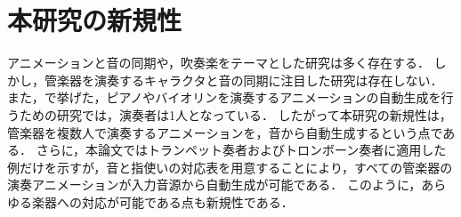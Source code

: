 \section{本研究の新規性}\label{sec:compere}
アニメーションと音の同期や，吹奏楽をテーマとした研究は多く存在する．
しかし，管楽器を演奏するキャラクタと音の同期に注目した研究は存在しない．
また，で挙げた，ピアノやバイオリンを演奏するアニメーションの自動生成を行うための研究では，演奏者は1人となっている．
したがって本研究の新規性は，管楽器を複数人で演奏するアニメーションを，音から自動生成するという点である．
さらに，本論文ではトランペット奏者およびトロンボーン奏者に適用した例だけを示すが，音と指使いの対応表を用意することにより，すべての管楽器の演奏アニメーションが入力音源から自動生成が可能である．
このように，あらゆる楽器への対応が可能である点も新規性である．
